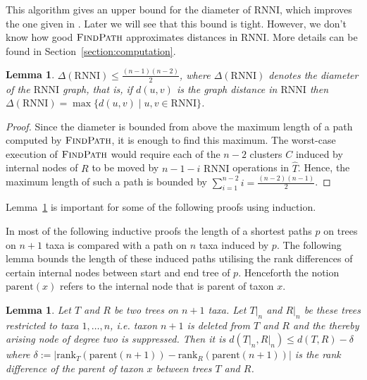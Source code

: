 \documentclass{amsart}
\newcommand{\parent}{\mathrm{parent}}
\newcommand{\rank}{\mathrm{rank}}
\newcommand{\rnni}{\mathrm{RNNI}}
\newcommand{\findpath}{\textsc{FindPath}}
\newtheorem{lemma}[definition]{Lemma}
\begin{document}
This algorithm gives an upper bound for the diameter of $\rnni$, which
improves
the one given in \autocite{Gavryushkin2018-ol}.
Later we will see that this bound is tight.
However, we don't know how good $\findpath$ approximates distances in $\rnni$. 
More details can be found in Section~\ref{section:computation}.

\begin{lemma}
$\Delta(\rnni) \leq \frac{(n-1)(n-2)}{2}$, where $\Delta(\rnni)$ denotes the diameter of the $\rnni$ graph, that is, if $d(u, v)$ is the graph distance in $\rnni$ then $\Delta(\rnni) = \max \{d(u, v) \mid u, v \in \rnni\}$.
\label{lemma:diameter_bound}
\end{lemma}

\begin{proof}
Since the diameter is bounded from above the maximum length of a path computed by $\findpath$, it is enough to find this maximum.
The worst-case execution of $\findpath$ would require each of the $n-2$ clusters $C$ induced by internal nodes of $R$ to be moved by $n - 1 - i$ $\rnni$ operations in $\hat{T}$.
Hence, the maximum length of such a path is bounded by $\sum\limits_{i = 1}^{n-2} i = \frac{(n-2)(n-1)}{2}$.
\end{proof}

Lemma~\ref{lemma:distance_delete_taxon} is important for some of the following proofs using induction.

In most of the following inductive proofs the length of a shortest paths $p$ on trees on $n+1$ taxa is compared with a path on $n$ taxa induced by $p$.
The following lemma bounds the length of these induced paths utilising the rank differences of certain internal nodes between start and end tree of $p$.
Henceforth the notion $\parent(x)$ refers to the internal node that is parent of taxon $x$.

\begin{lemma}
    Let $T$ and $R$ be two trees on $n+1$ taxa.
    Let $T{\big|}_n$ and $R{\big|}_n$ be these trees restricted to taxa $1, \ldots, n$, i.e. taxon $n+1$ is deleted from $T$ and $R$ and the thereby arising node of degree two is suppressed.
    Then it is $d(T{\big|}_n, R{\big|}_n) \leq d(T,R) - \delta$ where $\delta:= |\rank_T(\parent(n+1)) - \rank_R(\parent(n+1))|$ is the rank difference of the parent of taxon $x$ between trees $T$ and $R$.
    \label{lemma:distance_delete_taxon}
\end{lemma}
\end{document}
